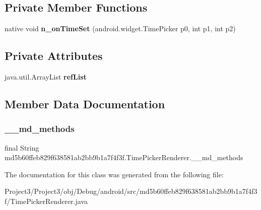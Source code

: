 \subsection*{Private Member Functions}
\begin{DoxyCompactItemize}
\item 
\mbox{\label{classmd5b60ffeb829f638581ab2bb9b1a7f4f3f_1_1TimePickerRenderer_a2169d0643bdc07403d1330e5ebaf4ba5}} 
native void {\bfseries n\+\_\+on\+Time\+Set} (android.\+widget.\+Time\+Picker p0, int p1, int p2)
\end{DoxyCompactItemize}
\subsection*{Private Attributes}
\begin{DoxyCompactItemize}
\item 
\mbox{\label{classmd5b60ffeb829f638581ab2bb9b1a7f4f3f_1_1TimePickerRenderer_ac8725b3e7813e45a02000d4b84812e6f}} 
java.\+util.\+Array\+List {\bfseries ref\+List}
\end{DoxyCompactItemize}


\subsection{Member Data Documentation}
\mbox{\label{classmd5b60ffeb829f638581ab2bb9b1a7f4f3f_1_1TimePickerRenderer_a3c77da783a54f125d97047436f80a34c}} 
\subsubsection{\texorpdfstring{\+\_\+\+\_\+md\+\_\+methods}{\_\_md\_methods}}
{\footnotesize\ttfamily final String md5b60ffeb829f638581ab2bb9b1a7f4f3f.\+Time\+Picker\+Renderer.\+\_\+\+\_\+md\+\_\+methods\hspace{0.3cm}{\ttfamily [static]}}



The documentation for this class was generated from the following file\+:\begin{DoxyCompactItemize}
\item 
Project3/\+Project3/obj/\+Debug/android/src/md5b60ffeb829f638581ab2bb9b1a7f4f3f/Time\+Picker\+Renderer.\+java\end{DoxyCompactItemize}
